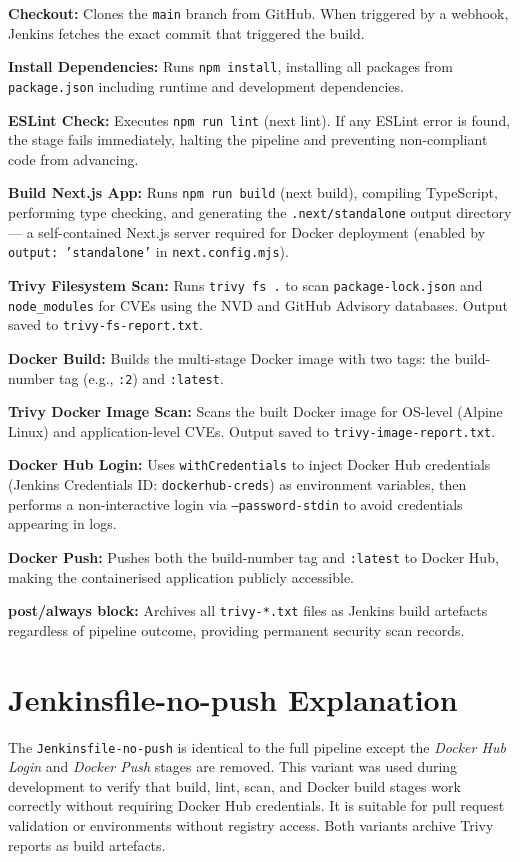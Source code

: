 \documentclass[12pt,a4paper,oneside]{report}
\begin{document}
\textbf{Checkout:} Clones the \texttt{main} branch from GitHub. When triggered by
a webhook, Jenkins fetches the exact commit that triggered the build.

\textbf{Install Dependencies:} Runs \texttt{npm install}, installing all packages
from \texttt{package.json} including runtime and development dependencies.

\textbf{ESLint Check:} Executes \texttt{npm run lint} (next lint). If any ESLint
error is found, the stage fails immediately, halting the pipeline and preventing
non-compliant code from advancing.

\textbf{Build Next.js App:} Runs \texttt{npm run build} (next build), compiling
TypeScript, performing type checking, and generating the \texttt{.next/standalone}
output directory --- a self-contained Next.js server required for Docker deployment
(enabled by \texttt{output: 'standalone'} in \texttt{next.config.mjs}).

\textbf{Trivy Filesystem Scan:} Runs \texttt{trivy fs .} to scan
\texttt{package-lock.json} and \texttt{node\_modules} for CVEs using the NVD and
GitHub Advisory databases. Output saved to \texttt{trivy-fs-report.txt}.

\textbf{Docker Build:} Builds the multi-stage Docker image with two tags: the
build-number tag (e.g., \texttt{:2}) and \texttt{:latest}.

\textbf{Trivy Docker Image Scan:} Scans the built Docker image for OS-level (Alpine
Linux) and application-level CVEs. Output saved to \texttt{trivy-image-report.txt}.

\textbf{Docker Hub Login:} Uses \texttt{withCredentials} to inject Docker Hub
credentials (Jenkins Credentials ID: \texttt{dockerhub-creds}) as environment
variables, then performs a non-interactive login via \texttt{--password-stdin}
to avoid credentials appearing in logs.

\textbf{Docker Push:} Pushes both the build-number tag and \texttt{:latest} to
Docker Hub, making the containerised application publicly accessible.

\textbf{post/always block:} Archives all \texttt{trivy-*.txt} files as Jenkins build
artefacts regardless of pipeline outcome, providing permanent security scan records.

\section{Jenkinsfile-no-push Explanation}

The \texttt{Jenkinsfile-no-push} is identical to the full pipeline except the
\emph{Docker Hub Login} and \emph{Docker Push} stages are removed. This variant was
used during development to verify that build, lint, scan, and Docker build stages
work correctly without requiring Docker Hub credentials. It is suitable for pull
request validation or environments without registry access. Both variants archive
Trivy reports as build artefacts.
\end{document}
